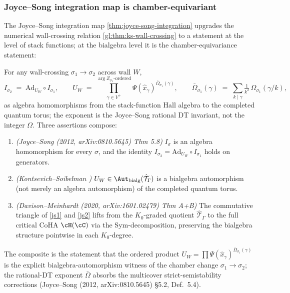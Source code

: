 \subsubsection{Joyce--Song integration map is chamber-equivariant}
\label{subsec:js-integration-chamber-equivariance}

The Joyce--Song integration map \cref{thm:joyce-song-integration} upgrades
the numerical wall-crossing relation \cref{gl:thm:ks-wall-crossing} to a
statement at the level of stack functions; at the bialgebra level it is
the chamber-equivariance statement:

\begin{theorem}
 \label{thm:js-bialgebra-chamber-equivariance}
 For any wall-crossing $\sigma_1 \to \sigma_2$ across wall $W$,
 \[
 I_{\sigma_2} \;=\; \mathrm{Ad}_{U_W} \circ I_{\sigma_1},
 \qquad
 U_W \;=\; \prod_{\gamma \in V^+}^{\arg Z_{\sigma_1}\text{-ordered}}
 \Psi(\hat{x}_\gamma)^{\bar{\Omega}_{\sigma_1}(\gamma)},
 \qquad
 \bar{\Omega}_{\sigma_1}(\gamma) \;=\; \sum_{k \mid \gamma} \tfrac{1}{k^2}\,\Omega_{\sigma_1}(\gamma/k),
 \]
 as algebra homomorphisms from the stack-function Hall algebra to the
 completed quantum torus; the exponent is the Joyce--Song rational DT
 invariant, not the integer $\Omega$. Three assertions compose:
 \begin{enumerate}[leftmargin=2em]
 \item\label{js1} \emph{(Joyce--Song (2012, arXiv:0810.5645) Thm 5.8)}
 $I_\sigma$ is an algebra homomorphism for every $\sigma$, and the
 identity $I_{\sigma_2} = \mathrm{Ad}_{U_W} \circ I_{\sigma_1}$
 holds on generators.
 \item\label{js2} \emph{(Kontsevich--Soibelman \cite[\S 6.3]{KS2008})}
 $U_W \in \Aut_{\mathrm{bialg}}(\hat{\mathcal{T}}_\Gamma)$ is a bialgebra
 automorphism (not merely an algebra automorphism) of the
 completed quantum torus.
 \item\label{js3} \emph{(Davison--Meinhardt (2020, arXiv:1601.02479) Thm A+B)}
 The commutative triangle of \ref{js1} and \ref{js2} lifts from
 the $K_0$-graded quotient $\hat{\mathcal{T}}_\Gamma$ to the full critical CoHA
 $\cH(\cC)$ via the Sym-decomposition, preserving the bialgebra
 structure pointwise in each $K_0$-degree.
 \end{enumerate}
 The composite is the statement that the ordered product
 $U_W = \prod \Psi(\hat{x}_\gamma)^{\bar{\Omega}_{\sigma_1}(\gamma)}$ is
 the explicit bialgebra-automorphism witness of the chamber change
 $\sigma_1 \to \sigma_2$; the rational-DT exponent $\bar{\Omega}$
 absorbs the multicover strict-semistability corrections
 (Joyce--Song (2012, arXiv:0810.5645) \S 5.2, Def.~5.4).
\end{theorem}

